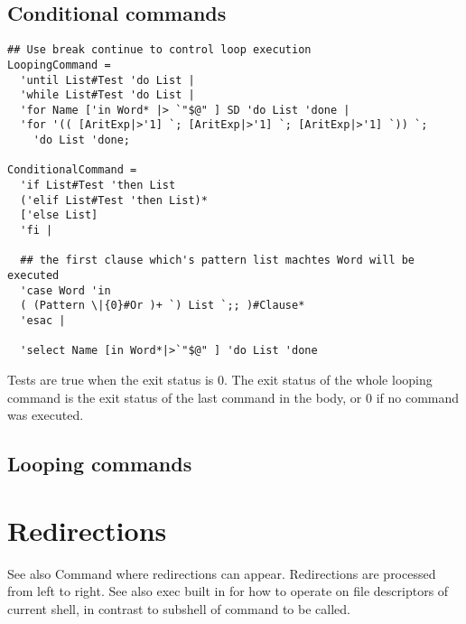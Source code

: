 \documentclass{article}
\begin{document}
\subsection{Conditional commands }

\begin{verbatim}
## Use break continue to control loop execution        
LoopingCommand =
  'until List#Test 'do List |
  'while List#Test 'do List |
  'for Name ['in Word* |> `"$@" ] SD 'do List 'done |
  'for '(( [AritExp|>'1] `; [AritExp|>'1] `; [AritExp|>'1] `)) `;
    'do List 'done;

ConditionalCommand =
  'if List#Test 'then List                
  ('elif List#Test 'then List)*
  ['else List]
  'fi |

  ## the first clause which's pattern list machtes Word will be executed     
  'case Word 'in
  ( (Pattern \|{0}#Or )+ `) List `;; )#Clause*     
  'esac |
        
  'select Name [in Word*|>`"$@" ] 'do List 'done
\end{verbatim}

Tests are true when the exit status is 0. The exit status of the whole
looping command is the exit status of the last command in the body, or 0
if no command was executed.



\subsection{Looping commands }

\section{Redirections}

See also Command where redirections can appear. Redirections are
processed from left to right. See also exec built in for how to operate
on file descriptors of current shell, in contrast to subshell of command
to be called.
\end{document}
